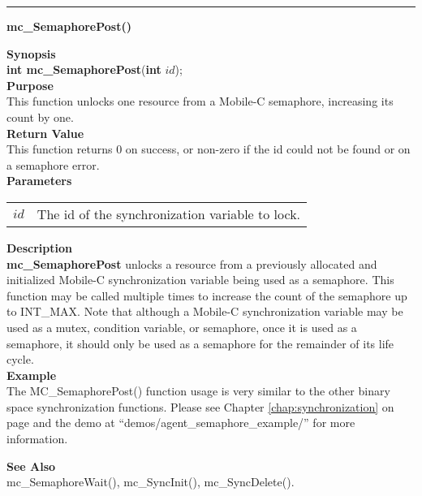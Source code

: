 \noindent
\vspace{5pt}
\rule{6.5in}{0.015in}
\noindent
{}
{\LARGE \bf mc\_SemaphorePost()}\\

\noindent
{\bf Synopsis}\\
{\bf int mc\_SemaphorePost}({\bf int} $id$);\\

\noindent
{\bf Purpose}\\
This function unlocks one resource from a Mobile-C semaphore, increasing its
count by one.\\

\noindent
{\bf Return Value}\\
This function returns 0 on success, or non-zero if the id could not be found 
or on a semaphore error. \\

\noindent
{\bf Parameters}
\vspace{-0.1pt}
\begin{description}
\item
\begin{tabular}{p{10 mm}p{145 mm}} 
$id$ & The id of the synchronization variable to lock. 
\end{tabular}
\end{description}

\noindent
{\bf Description}\\
{\bf mc\_SemaphorePost} unlocks a resource from a previously allocated and 
initialized Mobile-C synchronization variable being used as a semaphore. 
This function may be called multiple times to increase the count of the 
semaphore up to INT\_MAX. 
Note that although a Mobile-C synchronization variable may be used as a mutex, 
condition variable, or semaphore, once it is used as a semaphore, it should 
only be used as a semaphore for the remainder of its life cycle.\\

\noindent
{\bf Example}\\
The MC\_SemaphorePost() function usage is very similar to the other
binary space synchronization functions. Please see Chapter 
\ref{chap:synchronization} on page \pageref{chap:synchronization} 
and the demo at ``demos/agent\_semaphore\_example/'' for
more information.\\
\noindent

\noindent
{\bf See Also}\\
mc\_SemaphoreWait(), mc\_SyncInit(), mc\_SyncDelete().\\

